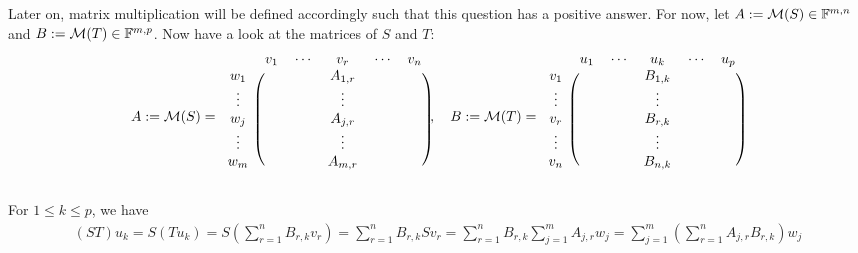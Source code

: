 Later on, matrix multiplication will be defined accordingly such that this question has a positive answer.
For now, let $A := \mathcal{M}(S)\in \mathbb{F}^{m,n}$ and $B := \mathcal{M}(T)\in \mathbb{F}^{m,p}$. Now have a look at the matrices of $S$ and $T$:
\begin{equation}
  A := \mathcal{M} (S) =
  \begin{blockarray}{cccccc}
    & v_1 & \cdots & v_r     & \cdots & v_n \\
    \begin{block}{c(ccccc)}
      w_1    &     &        & A_{1,r} &        &     \\
      \vdots &     &        & \vdots  &        &     \\
      w_j    &     &        & A_{j,r} &        &     \\
      \vdots &     &        & \vdots  &        &     \\
      w_m    &     &        & A_{m,r} &        &     \\
    \end{block}
  \end{blockarray},
  \quad
  B := \mathcal{M} (T) =
  \begin{blockarray}{cccccc}
    & u_1 & \cdots & u_k     & \cdots & u_p \\
    \begin{block}{c(ccccc)}
      v_1    &     &        & B_{1,k} &        &     \\
      \vdots &     &        & \vdots  &        &     \\
      v_r    &     &        & B_{r,k} &        &     \\
      \vdots &     &        & \vdots  &        &     \\
      v_n    &     &        & B_{n,k} &        &     \\
    \end{block}
  \end{blockarray}
\end{equation}

For $1 \leq k \leq p$, we have
\begin{equation}
  \begin{aligned}
    (ST) u_k
    = S (Tu_k)
    = S \left ( \sum_{r=1}^{n} B_{r,k} v_r \right )
    =  \sum_{r=1}^{n} B_{r,k} S v_r
    =  \sum_{r=1}^{n} B_{r,k} \sum_{j=1}^{m} A_{j,r}  w_j
    =  \sum_{j=1}^{m} \left( \sum_{r=1}^{n} A_{j,r}  B_{r,k} \right) w_j
  \end{aligned}
\end{equation}

